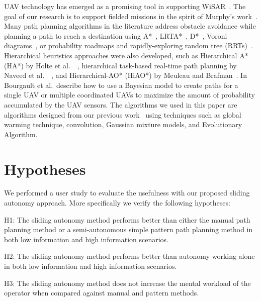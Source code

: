 \documentclass[lettersize, apacite, twoside, HRI]{apa_HRI}
\begin{document}
UAV technology has emerged as a promising tool in supporting WiSAR~\cite{Murphy2008Cooperative,Bourgault2003Coordinated}. The goal of our research is to support fielded missions in the spirit of Murphy's work~\cite{Casper2003Human}. Many path planning algorithms in the literature address obstacle avoidance while planning a path to reach a destination using A*~\cite{Quigley2005Towards}, LRTA*~\cite{Howlett2006Learning}, D*~\cite{Stentz1997Optimal}, Voroni diagrams~\cite{Bortoff2000Path,Beard2005Autonomous}, or probability roadmaps and rapidly-exploring random tree (RRTs)~\cite{Pettersson2006Probabilistic}. Hierarchical heuristics approaches were also developed, such as Hierarchical A* (HA*) by Holte et al.\ ~\cite{Holte1996Hierarchical}, hierarchical task-based real-time path planning by Naveed et al.\ ~\cite{Meuleau2007Hierarchical}, and Hierarchical-AO* (HiAO*) by Meuleau and Brafman~\cite{Naveed2010Hierarchical}. In~\cite{Bourgault2006Optimal, Bourgault2004Coordinated} Bourgault et al.\ describe how to use a Bayesian model to create paths for a single UAV or multiple coordinated UAVs to maximize the amount of probability accumulated by the UAV sensors. The algorithms we used in this paper are algorithms designed from our previous work~\cite{Lin2009UAV,Lin2014Hierarchical} using techniques such as global warming technique, convolution, Gaussian mixture models, and Evolutionary Algorithm.

\section{Hypotheses} 
\label{sec:Hypotheses}

We performed a user study to evaluate the usefulness with our proposed sliding autonomy approach. More specifically we verify the following hypotheses:

H1: The sliding autonomy method performs better than either the manual path planning method or a semi-autonomous simple pattern path planning method in both low information and high information scenarios.

H2: The sliding autonomy method performs better than autonomy working alone in both low information and high information scenarios.

H3: The sliding autonomy method does not increase the mental workload of the operator when compared against manual and pattern methods.

\end{document}
